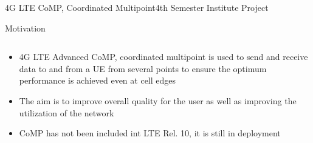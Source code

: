\documentclass[xcolor={cmyk}]{beamer}
\begin{document}
 \begin{frame}{4G LTE CoMP, Coordinated Multipoint}{4th Semester Institute Project}
	 \begin{block}{Motivation}
	 	\begin{columns}
			\begin{column}{.9\textwidth}
				\begin{itemize}
					\item 4G LTE Advanced CoMP, coordinated multipoint is used to send and receive data to and from a UE from several points to ensure the optimum performance is achieved even at cell edges
					\item The aim is to improve overall quality for the user as well as improving the utilization of the network 
					\item CoMP has not been included int LTE Rel. 10, it is still in deployment
				\end{itemize}
			\end{column}
		\end{columns}
	 \end{block}
 \end{frame}
\end{document}
